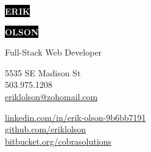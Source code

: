 \documentclass[9pt]{developercv} %
\begin{document}

\begin{minipage}[t]{0.45\textwidth} %
	\vspace{-\baselineskip} %
	
	\colorbox{black}{{\HUGE\textcolor{white}{\textbf{\MakeUppercase{Erik}}}}} %
	
	\colorbox{black}{{\HUGE\textcolor{white}{\textbf{\MakeUppercase{Olson}}}}} %
	
	\vspace{5pt}
	
	{\huge Full-Stack Web Developer} %
\end{minipage}
\begin{minipage}[t]{0.275\textwidth} %
	\vspace{-\baselineskip} %
	
	{5535 SE Madison St}\\
	{503.975.1208}\\
	{\href{mailto:eriklolson@zohomail.com}{eriklolson@zohomail.com}}\\	
\end{minipage}
\begin{minipage}[t]{0.375\textwidth} %
	\vspace{-\baselineskip} %
	
	{\href{https://linkedin.com/in/erik-olson-9b6bb7191}{linkedin.com/in/erik-olson-9b6bb7191}}\\
	{\href{https://github.com/eriklolson}{github.com/eriklolson}}\\
	{\href{https://bitbucket.org/cobrasolutions/}{bitbucket.org/cobrasolutions}}\\
\end{minipage}
\end{document}

